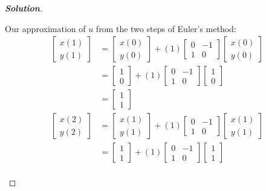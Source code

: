 \documentclass[11pt]{article}
\newenvironment{solution}{%
  \begin{proof}[\textbf{Solution}]$ $\par\nobreak\ignorespaces
}{%
  \end{proof}
}
\theoremstyle{definition}
\begin{document}
\begin{solution}
\begin{enumerate}[(a)]
Our approximation of $u$ from the two steps of Euler's method:
\begin{align*}
    \begin{bmatrix*}x(1) \\ y(1)\end{bmatrix*} &= \begin{bmatrix*}x(0) \\ y(0)\end{bmatrix*} + (1)\begin{bmatrix*}0 & -1 \\ 1 & 0\end{bmatrix*}\begin{bmatrix*}x(0) \\ y(0)\end{bmatrix*} \\
    &= \begin{bmatrix*}1 \\ 0\end{bmatrix*} + (1)\begin{bmatrix*}0 & -1 \\ 1 & 0\end{bmatrix*}\begin{bmatrix*}1 \\ 0\end{bmatrix*} \\
    &= \begin{bmatrix*}1 \\ 1\end{bmatrix*} \\
    \begin{bmatrix*}x(2) \\ y(2)\end{bmatrix*} &= \begin{bmatrix*}x(1) \\ y(1)\end{bmatrix*} + (1)\begin{bmatrix*}0 & -1 \\ 1 & 0\end{bmatrix*}\begin{bmatrix*}x(1) \\ y(1)\end{bmatrix*} \\
    &= \begin{bmatrix*}1 \\ 1\end{bmatrix*} + (1)\begin{bmatrix*}0 & -1 \\ 1 & 0\end{bmatrix*}\begin{bmatrix*}1 \\ 1\end{bmatrix*} \\

\end{align*}
\end{enumerate}
\end{solution}
\end{document}
